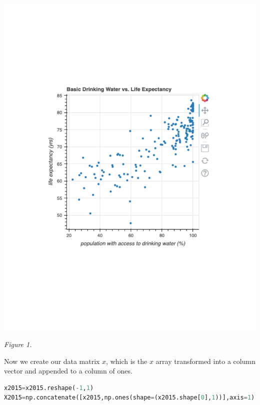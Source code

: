 \documentclass[12pt]{article}
\begin{document}
\begin{center}
\includegraphics[width=6in]{figure3.pdf}\\
\end{center}

\vspace{-160pt}

\begin{center}
    \textit{Figure 1.}
\end{center}

\vspace{20pt}

Now we create our data matrix $x$, which is the $x$ array transformed into a column vector and appended to a column of ones.
\begin{adjustwidth}{0.5in}{0.25in}
\begin{lstlisting}[language=Python]
x2015=x2015.reshape(-1,1)
X2015=np.concatenate([x2015,np.ones(shape=(x2015.shape[0],1))],axis=1)
\end{lstlisting}
\end{adjustwidth}
\end{document}

